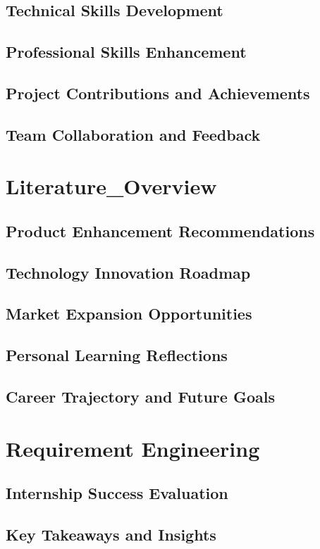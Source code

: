 \documentclass[a4paper, 11pt, oneside]{report}
\begin{document}
  \section{Technical Skills Development}
  \section{Professional Skills Enhancement}
  \section{Project Contributions and Achievements}
  \section{Team Collaboration and Feedback}
  

\chapter{Literature_Overview}
  \section{Product Enhancement Recommendations}
  \section{Technology Innovation Roadmap}
  \section{Market Expansion Opportunities}
  \section{Personal Learning Reflections}
  \section{Career Trajectory and Future Goals}
  

\chapter{Requirement Engineering}
  \section{Internship Success Evaluation}
  \section{Key Takeaways and Insights}
\end{document}
